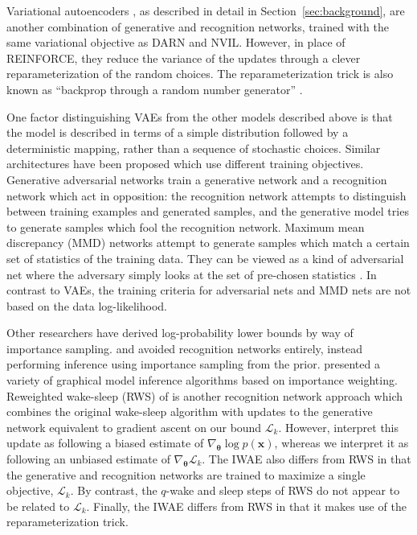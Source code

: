 \documentclass{article} %
\newcommand{\params}{{\boldsymbol{\theta}}}
\newcommand{\obs}{\mathbf{x}}
\newcommand{\pmfGen}{p}
\newcommand{\numSamples}{k}
\newcommand{\isBoundK}[1]{\mathcal{L}_{#1}}
\begin{document}
Variational autoencoders \citep{vae,vae2}, as described in detail in Section~\ref{sec:background}, are another combination of generative and recognition networks, trained with the same variational objective as DARN and NVIL. However, in place of REINFORCE, they reduce the variance of the updates through a clever reparameterization of the random choices. The reparameterization trick is also known as ``backprop through a random number generator'' \citep{reinforce}.

One factor distinguishing VAEs from the other models described above is that the model is described in terms of a simple distribution followed by a deterministic mapping, rather than a sequence of stochastic choices. Similar architectures have been proposed which use different training objectives. Generative adversarial networks \citep{generative_adversarial} train a generative network and a recognition network which act in opposition: the recognition network attempts to distinguish between training examples and generated samples, and the generative model tries to generate samples which fool the recognition network. Maximum mean discrepancy (MMD) networks \citep{yujia_mmd,karolina_mmd} attempt to generate samples which match a certain set of statistics of the training data. They can be viewed as a kind of adversarial net where the adversary simply looks at the set of pre-chosen statistics \citep{karolina_mmd}. In contrast to VAEs, the training criteria for adversarial nets and MMD nets are not based on the data log-likelihood.

Other researchers have derived log-probability lower bounds by way of importance sampling. \citet{charlie-stochastic} and \citet{jimmy-attention} avoided recognition networks entirely, instead performing inference using importance sampling from the prior. \citet{dechter-importance} presented a variety of graphical model inference algorithms based on importance weighting. Reweighted wake-sleep (RWS) of \cite{RWS} is another recognition network approach which combines the original wake-sleep algorithm with updates to the generative network equivalent to gradient ascent on our bound $\isBoundK{\numSamples}$. However, \citet{RWS} interpret this update as following a biased estimate of $\nabla_\params \log \pmfGen(\obs)$, whereas we interpret it as following an unbiased estimate of $\nabla_\params \isBoundK{\numSamples}$. The IWAE also differs from RWS in that the generative and recognition networks are trained to maximize a single objective, $\isBoundK{\numSamples}$. By contrast, the $q$-wake and sleep steps of RWS do not appear to be related to $\isBoundK{\numSamples}$. Finally, the IWAE differs from RWS in that it makes use of the reparameterization trick.
\end{document}
